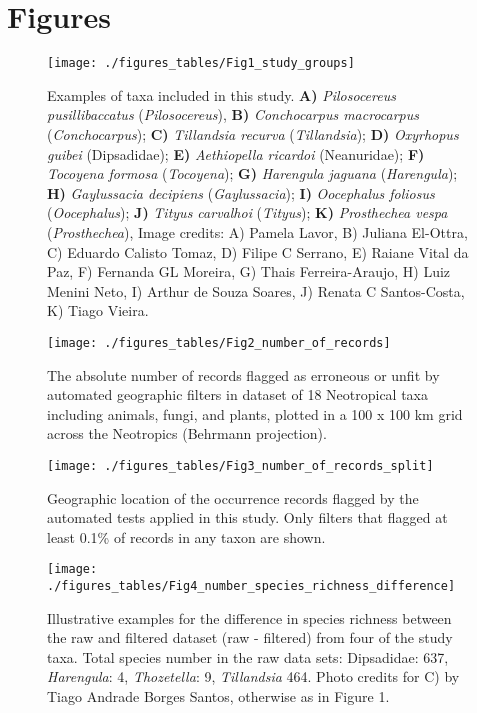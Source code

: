 \documentclass[fleqn,10pt,lineno]{wlpeerj} %
\begin{document}
\hypertarget{figures}{%
\section*{Figures}\label{figures}}

\begin{figure}
\texttt{[image: ./figures\_tables/Fig1\_study\_groups]} \caption{Examples of taxa included in this study. \textbf{A)} \textit{Pilosocereus pusillibaccatus} (\textit{Pilosocereus}), \textbf{B)} \textit{Conchocarpus macrocarpus} (\textit{Conchocarpus}); \textbf{C)} \textit{Tillandsia recurva} (\textit{Tillandsia}); \textbf{D)} \textit{Oxyrhopus guibei} (Dipsadidae); \textbf{E)} \textit{Aethiopella ricardoi} (Neanuridae); \textbf{F)} \textit{Tocoyena formosa} (\textit{Tocoyena}); \textbf{G)} \textit{Harengula jaguana} (\textit{Harengula}); \textbf{H)} \textit{Gaylussacia decipiens} (\textit{Gaylussacia}); \textbf{I)} \textit{Oocephalus foliosus} (\textit{Oocephalus}); \textbf{J)} \textit{Tityus carvalhoi} (\textit{Tityus}); \textbf{K)} \textit{Prosthechea vespa} (\textit{Prosthechea}), Image credits: A) Pamela Lavor, B) Juliana El-Ottra, C) Eduardo Calisto Tomaz, D) Filipe C Serrano, E) Raiane Vital da Paz, F) Fernanda GL Moreira, G) Thais Ferreira-Araujo, H) Luiz Menini Neto, I) Arthur de Souza Soares, J) Renata C Santos-Costa, K) Tiago Vieira.}\label{fig:species}
\end{figure}

\begin{figure}
\texttt{[image: ./figures\_tables/Fig2\_number\_of\_records]} \caption{The absolute number of records flagged as erroneous or unfit by automated geographic filters in dataset of 18 Neotropical taxa including animals, fungi, and plants, plotted in a 100 x 100 km grid across the Neotropics (Behrmann projection).}\label{fig:total}
\end{figure}

\begin{figure}
\texttt{[image: ./figures\_tables/Fig3\_number\_of\_records\_split]} \caption{Geographic location of the occurrence records flagged by the automated tests applied in this study. Only filters that flagged at least 0.1\% of records in any taxon are shown.}\label{fig:split}
\end{figure}

\begin{figure}
\texttt{[image: ./figures\_tables/Fig4\_number\_species\_richness\_difference]} \caption{Illustrative examples for the difference in species richness between the raw and filtered dataset (raw - filtered) from four of the study taxa. Total species number in the raw data sets: Dipsadidae: 637, \textit{Harengula}: 4, \textit{Thozetella}: 9, \textit{Tillandsia} 464.  Photo credits for C) by Tiago Andrade Borges Santos, otherwise as in Figure 1.}\label{fig:speciesrichness}
\end{figure}
\end{document}
